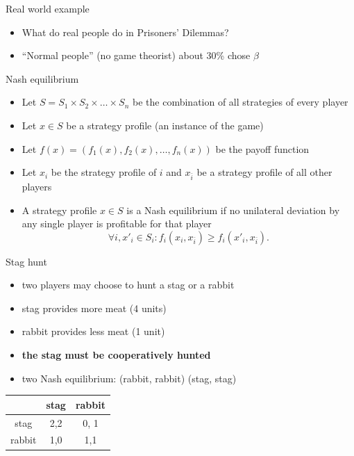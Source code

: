 \documentclass{beamer}
\begin{document}
\begin{frame}{Real world example}
  \begin{itemize}
  \item What do real people do in Prisoners' Dilemmas?
  \item ``Normal people'' (no game theorist) about 30\% chose $\beta$
  \end{itemize}
\end{frame}

\begin{frame}{Nash equilibrium}
  \begin{itemize}
  \item Let $S = S_1 \times S_2 \times \dots \times S_n$ be the
    combination of all strategies of every player
  \item<2-> Let $x \in S$ be a strategy profile (an instance of the game)
  \item<3-> Let $f(x) = (f_1(x), f_2(x), \dots, f_n(x))$ be the payoff
    function
  \item<4-> Let $x_i$ be the strategy profile of $i$ and $x_{\bar i}$ be a
    strategy profile of all other players
  \item<5-> A strategy profile $x \in S$ is a Nash equilibrium
    if no unilateral deviation by any single player is profitable for
    that player
\[
  \forall i,x'_i\in S_i :  f_i(x_{i}, x_{\bar i}) \geq f_i(x'_{i},x_{\bar i}).
\]

  \end{itemize}
\end{frame}

\begin{frame}[t]{Stag hunt}
  \begin{itemize}
    \item two players may choose to hunt a stag or a rabbit
    \item stag provides more meat (4 units)
    \item rabbit provides less meat (1 unit)
    \item<2-> \textbf{the stag must be cooperatively hunted}
    \item<4-> two Nash equilibrium: (rabbit, rabbit) (stag, stag)
  \end{itemize}
   {
\begin{center}
  \begin{tabular}{|c|c|c|}
    \hline
     & stag & rabbit  \\
    \hline
stag
     & 2,2 & 0, 1 \\
    \hline
rabbit
     & 1,0 & 1,1 \\
    \hline
  \end{tabular}
\end{center}
}
\end{frame}
\end{document}
